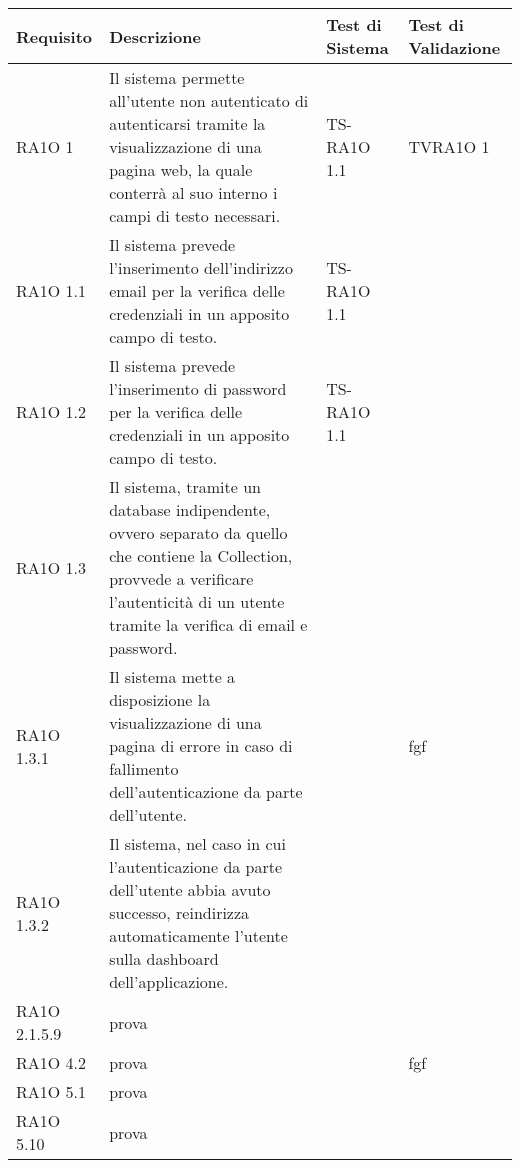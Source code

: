   \begin{center}
  \def\arraystretch{1.5}
  \bgroup
    \begin{longtable}{| p{2.5cm} | p{5cm} | p{2.5cm} | p{3cm} | }
    \hline 
     \textbf{Requisito} & \textbf{Descrizione} & \textbf{Test di Sistema} & \textbf{Test di Validazione} \\ \hline
        RA1O 1 & 
        Il sistema permette all'utente non autenticato di autenticarsi tramite la visualizzazione di una pagina web, la quale conterrà al suo interno i campi di testo necessari.  & TS-RA1O 1.1 &TVRA1O 1 \\ \hline 
        RA1O 1.1 & 
        Il sistema prevede l'inserimento dell'indirizzo email per la verifica delle credenziali in un apposito campo di testo. & TS-RA1O 1.1 & \\ \hline 
        RA1O 1.2 & 
        Il sistema prevede l'inserimento di password per la verifica delle credenziali in un apposito campo di testo. & TS-RA1O 1.1 & \\ \hline 
        RA1O 1.3 & 
        Il sistema, tramite un database indipendente, ovvero separato da quello che contiene la Collection, provvede a verificare l'autenticità  di un utente tramite la verifica di email e password. &  &  \\ \hline 
        RA1O 1.3.1 & 
        Il sistema mette a disposizione la visualizzazione di una pagina di errore in caso di fallimento dell'autenticazione da parte dell'utente. &  & fgf \\ \hline 
        RA1O 1.3.2 & 
        Il sistema, nel caso in cui l'autenticazione da parte dell'utente abbia avuto successo, reindirizza automaticamente l'utente sulla dashboard dell'applicazione. &  &  \\ \hline 
        RA1O 2.1.5.9 & 
        prova &  &  \\ \hline 
        RA1O 4.2 & 
        prova &  & fgf \\ \hline 
        RA1O 5.1 & 
        prova &  &  \\ \hline 
        RA1O 5.10 & 
        prova &  &  \\ \hline 
    \end{longtable}
   \egroup
\end{center}
\clearpage
